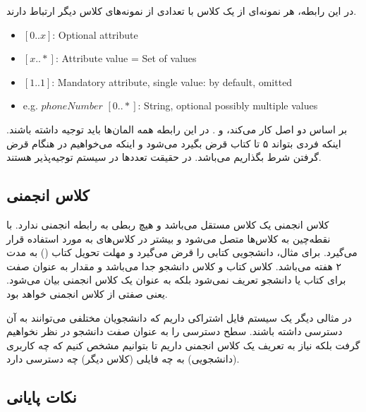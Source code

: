 در این رابطه، هر نمونه‌ای از یک کلاس با تعدادی از نمونه‌های کلاس دیگر ارتباط
دارند.

\begin{LTR}
    \begin{itemize}
        \item $[0..x]$: Optional attribute
        \item $[x..*]$: Attribute value = Set of values
        \item $[1..1]$: Mandatory attribute, single value: by default, omitted
        \item e.g. $phoneNumber$ $[0..*]$: String, optional possibly multiple
        values
    \end{itemize}
\end{LTR}

بر اساس دو اصل کار می‌کند،  و . در این رابطه
همه المان‌ها باید توجیه داشته باشند. اینکه فردی بتواند ۵ تا کتاب قرض بگیرد
می‌شود  و اینکه می‌خواهیم در هنگام قرض گرفتن شرط بگذاریم
 می‌باشد. در حقیقت تعدد‌ها در سیستم توجیه‌پذیر هستند.

\subsection{کلاس انجمنی}

کلاس انجمنی یک کلاس مستقل می‌باشد و هیچ ربطی به رابطه انجمنی ندارد. با نقطه‌چین
به کلاس‌ها متصل می‌شود و بیشتر در کلاس‌های  به  مورد استفاده قرار
می‌گیرد. برای مثال، دانشجویی کتابی را قرض می‌گیرد و مهلت تحویل کتاب () به مدت ۲ هفته می‌باشد. کلاس کتاب و کلاس دانشجو جدا می‌باشد و مقدار
 به عنوان صفت برای کتاب یا دانشجو تعریف نمی‌شود بلکه به عنوان
یک کلاس انجمنی بیان می‌شود. یعنی صفتی از کلاس انجمنی خواهد بود.

در مثالی دیگر یک سیستم فایل اشتراکی داریم که دانشجویان مختلفی می‌توانند به آن
دسترسی داشته باشند. سطح دسترسی را به عنوان صفت دانشجو در نظر نخواهیم گرفت بلکه
نیاز به تعریف یک کلاس انجمنی داریم تا بتوانیم مشخص کنیم که چه کاربری (دانشجویی)
به چه فایلی (کلاس دیگر) چه دسترسی دارد.

\begin{LTR}


\end{LTR}

\subsection{نکات پایانی}

